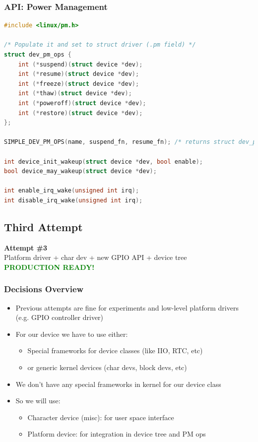 \documentclass[aspectratio=169,usenames,dvipsnames]{beamer}
\newcounter{cont}
\begin{document}
\begin{frame}[containsverbatim]
  \frametitle{API: Power Management}
  \begin{lstlisting}[language=c,numbers=none]
#include <linux/pm.h>

/* Populate it and set to struct driver (.pm field) */
struct dev_pm_ops {
	int (*suspend)(struct device *dev);
	int (*resume)(struct device *dev);
	int (*freeze)(struct device *dev);
	int (*thaw)(struct device *dev);
	int (*poweroff)(struct device *dev);
	int (*restore)(struct device *dev);
};

SIMPLE_DEV_PM_OPS(name, suspend_fn, resume_fn); /* returns struct dev_pm_ops */

int device_init_wakeup(struct device *dev, bool enable);
bool device_may_wakeup(struct device *dev);

int enable_irq_wake(unsigned int irq);
int disable_irq_wake(unsigned int irq);
  \end{lstlisting}
\end{frame}

\subsection{Third Attempt}

\begin{frame}[standout]
  \textbf{Attempt \#3} \\
  \vspace{5mm}
  Platform driver + char dev + new GPIO API + device tree  \\
  \vspace{5mm}
  \textbf{\textcolor{green}{PRODUCTION READY!}}
\end{frame}

\begin{frame}
  \frametitle{Decisions Overview}
  \begin{itemize}
    \item Previous attempts are fine for experiments and low-level platform
          drivers (e.g. GPIO controller driver)
    \item For our device we have to use either:
    \begin{itemize}
      \item Special frameworks for device classes (like IIO, RTC, etc)
      \item or generic kernel devices (char devs, block devs, etc)
    \end{itemize}
    \item We don't have any special frameworks in kernel for our device class
    \item So we will use:
    \begin{itemize}
      \item Character device (misc): for user space interface
      \item Platform device: for integration in device tree and PM ops
    \end{itemize}
  \end{itemize}
\end{frame}
\end{document}
